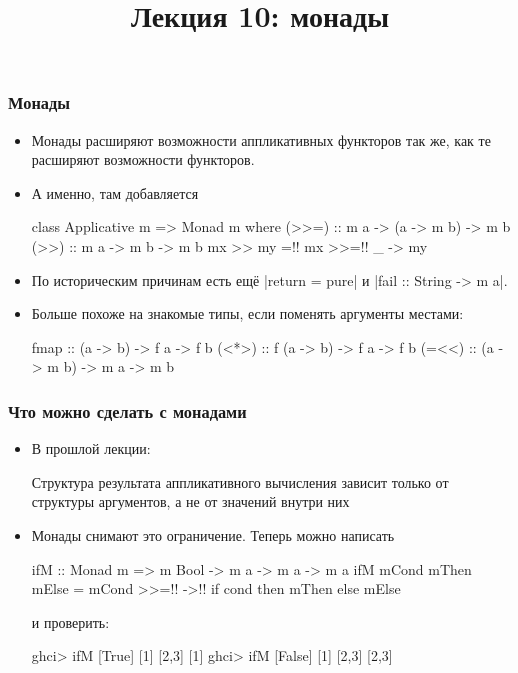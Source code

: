 \documentclass[11pt]{beamer}
\title{Лекция 10: монады}
\begin{document}
\begin{frame}[plain]
  \maketitle
\end{frame}

\begin{frame}[fragile]
  \frametitle{Монады}
  \begin{itemize}
    \item Монады расширяют возможности аппликативных функторов так же, как те расширяют возможности функторов.
    \item А именно, там добавляется
          \begin{haskell}
            class Applicative m => Monad m where
              (>>=) :: m a -> (a -> m b) -> m b
              (>>) :: m a -> m b -> m b
              mx >> my =!\pause! mx >>=!\pause! \_ -> my
          \end{haskell}
          \pause
    \item По историческим причинам есть ещё \haskinline|return = pure| и \haskinline|fail :: String -> m a|.  %
          \pause
    \item Больше похоже на знакомые типы, если поменять аргументы местами:
          \begin{haskell}
            fmap  ::   (a -> b) -> f a -> f b
            (<*>) :: f (a -> b) -> f a -> f b
            (=<<) :: (a -> m b) -> m a -> m b
          \end{haskell}
  \end{itemize}
\end{frame}

\begin{frame}[fragile]
  \frametitle{Что можно сделать с монадами}
  \begin{itemize}
    \item В прошлой лекции:
          \begin{displayquote}
            Структура результата аппликативного вычисления зависит только от структуры аргументов, а не от значений внутри них
          \end{displayquote}
    \item Монады снимают это ограничение. Теперь можно написать
          \begin{haskell}
            ifM :: Monad m => m Bool -> m a -> m a -> m a
            ifM mCond mThen mElse = mCond >>=!\pause! \cond ->!\pause!
              if cond then mThen else mElse
          \end{haskell}
          и проверить:
          \begin{haskell}
            ghci> ifM [True] [1] [2,3]
            [1]
            ghci> ifM [False] [1] [2,3]
            [2,3]
          \end{haskell}
  \end{itemize}
\end{frame}
\end{document}
